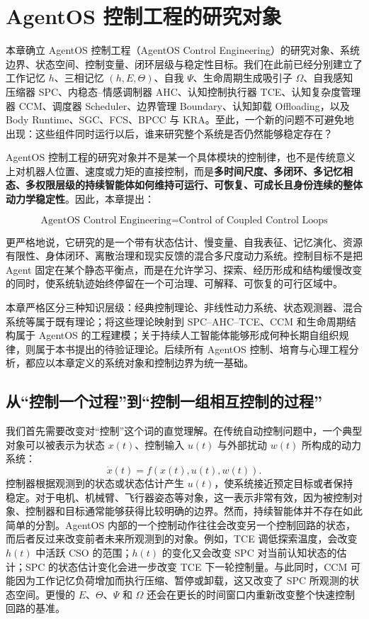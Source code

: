 \chapter{AgentOS 控制工程的研究对象}
\label{chap:agentos-control-engineering-object}

\begin{chapterlead}
本章确立 AgentOS 控制工程（AgentOS Control Engineering）的研究对象、系统边界、状态空间、控制变量、闭环层级与稳定性目标。我们在此前已经分别建立了工作记忆 $h$、三相记忆 $(h,E,\Theta)$、自我 $\Psi$、生命周期生成吸引子 $\Omega$、自我感知压缩器 SPC、内稳态--情感调制器 AHC、认知控制执行器 TCE、认知复杂度管理器 CCM、调度器 Scheduler、边界管理 Boundary、认知卸载 Offloading，以及 Body Runtime、SGC、FCS、BPCC 与 KRA。至此，一个新的问题不可避免地出现：这些组件同时运行以后，谁来研究整个系统是否仍然能够稳定存在？

AgentOS 控制工程的研究对象并不是某一个具体模块的控制律，也不是传统意义上对机器人位置、速度或力矩的直接控制，而是\textbf{多时间尺度、多闭环、多记忆相态、多权限层级的持续智能体如何维持可运行、可恢复、可成长且身份连续的整体动力学稳定性}。因此，本章提出：

\[
\boxed{
\text{AgentOS Control Engineering}
=
\text{Control of Coupled Control Loops}
}
\]

更严格地说，它研究的是一个带有状态估计、慢变量、自我表征、记忆演化、资源有限性、身体闭环、离散治理和现实反馈的混合多尺度动力系统。控制目标不是把 Agent 固定在某个静态平衡点，而是在允许学习、探索、经历形成和结构缓慢改变的同时，使系统轨迹始终停留在一个可治理、可解释、可恢复的可行区域中。

本章严格区分三种知识层级：经典控制理论、非线性动力系统、状态观测器、混合系统等属于既有理论；将这些理论映射到 SPC--AHC--TCE、CCM 和生命周期结构属于 AgentOS 的工程建模；关于持续人工智能体能够形成何种长期自组织规律，则属于本书提出的待验证理论。后续所有 AgentOS 控制、培育与心理工程分析，都应以本章定义的系统对象和控制边界为统一基础。
\end{chapterlead}


\section{从“控制一个过程”到“控制一组相互控制的过程”}

我们首先需要改变对“控制”这个词的直觉理解。在传统自动控制问题中，一个典型对象可以被表示为状态 $x(t)$、控制输入 $u(t)$ 与外部扰动 $w(t)$ 所构成的动力系统：
\[
\dot{x}(t)=f(x(t),u(t),w(t)).
\]
控制器根据观测到的状态或状态估计产生 $u(t)$，使系统接近预定目标或者保持稳定。对于电机、机械臂、飞行器姿态等对象，这一表示非常有效，因为被控制对象、控制器和目标通常能够获得比较明确的边界。然而，持续智能体并不存在如此简单的分割。AgentOS 内部的一个控制动作往往会改变另一个控制回路的状态，而后者反过来改变前者未来所观测到的对象。例如，TCE 调低探索温度，会改变 $h(t)$ 中活跃 CSO 的范围；$h(t)$ 的变化又会改变 SPC 对当前认知状态的估计；SPC 的状态估计变化会进一步改变 TCE 下一轮控制量。与此同时，CCM 可能因为工作记忆负荷增加而执行压缩、暂停或卸载，这又改变了 SPC 所观测的状态空间。更慢的 $E$、$\Theta$、$\Psi$ 和 $\Omega$ 还会在更长的时间窗口内重新改变整个快速控制回路的基准。

